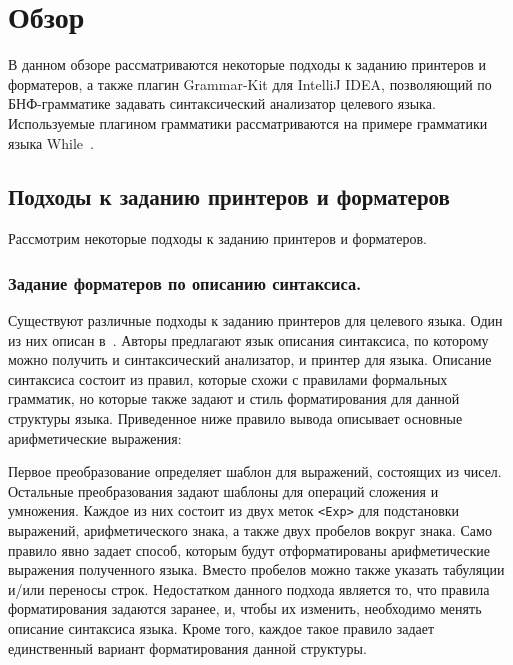 \section{Обзор}
\lstset{basicstyle=\normalsize\ttfamily, columns=fullflexible}
В данном обзоре рассматриваются некоторые подходы к заданию принтеров и форматеров, а также плагин Grammar-Kit для IntelliJ IDEA, позволяющий по БНФ-грамматике задавать синтаксический анализатор целевого языка.
Используемые плагином грамматики рассматриваются на примере грамматики языка While~\cite{paper:nielson}.

\subsection{Подходы к заданию принтеров и форматеров}
Рассмотрим некоторые подходы к заданию принтеров и форматеров.
\subsubsection{Задание форматеров по описанию синтаксиса.}%
Существуют различные подходы к заданию принтеров для целевого языка.
Один из них описан в~\cite{paper:tbe}.
Авторы предлагают язык описания синтаксиса, по которому можно получить и синтаксический анализатор, и принтер для языка.
Описание синтаксиса состоит из правил, которые схожи с правилами формальных грамматик, но которые также задают и стиль форматирования для данной структуры языка.
Приведенное ниже правило вывода описывает основные арифметические выражения:
{
    
}
\noindent
Первое преобразование определяет шаблон для выражений, состоящих из чисел.
Остальные преобразования задают шаблоны для операций сложения и умножения.
Каждое из них состоит из двух меток \lstinline{<Exp>} для подстановки выражений, арифметического знака, а также двух пробелов вокруг знака.
Само правило явно задает способ, которым будут отформатированы арифметические выражения полученного языка.
Вместо пробелов можно также указать табуляции и/или переносы строк.
Недостатком данного подхода является то, что правила форматирования задаются заранее, и, чтобы их изменить, необходимо менять описание синтаксиса языка.
Кроме того, каждое такое правило задает единственный вариант форматирования данной структуры.

